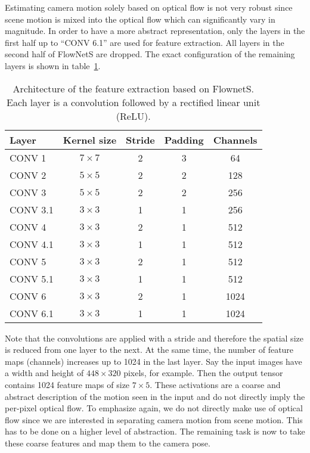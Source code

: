 			Estimating camera motion solely based on optical flow is not very robust since scene motion is mixed into the optical flow which can significantly vary in magnitude.
			In order to have a more abstract representation, only the layers in the first half up to ``CONV 6.1'' are used for feature extraction.
			All layers in the second half of FlowNetS are dropped.
			The exact configuration of the remaining layers is shown in table~\ref{tbl:first_part_of_flownets}.
			\begin{table}[tb]
				\small
				\begin{center}
					\begin{tabular}{lcccc}
						\toprule
						Layer 		& Kernel size 		& Stride 		& Padding 		& Channels 		\\
						\midrule
						CONV 1 		& $7 \times 7$		& 2 			& 3 			& 64 			\\
						CONV 2 		& $5 \times 5$		& 2 			& 2 			& 128 			\\
						CONV 3 		& $5 \times 5$		& 2 			& 2 			& 256			\\
						CONV 3.1 	& $3 \times 3$		& 1 			& 1 			& 256 			\\
						CONV 4 		& $3 \times 3$		& 2 			& 1 			& 512 			\\
						CONV 4.1 	& $3 \times 3$		& 1 			& 1 			& 512 			\\
						CONV 5 		& $3 \times 3$		& 2 			& 1 			& 512 			\\
						CONV 5.1 	& $3 \times 3$		& 1 			& 1 			& 512 			\\
						CONV 6 		& $3 \times 3$		& 2 			& 1 			& 1024 			\\
						CONV 6.1 	& $3 \times 3$		& 1 			& 1 			& 1024 			\\
						\bottomrule
					\end{tabular}
				\end{center}
				\caption[Architecture of the feature extraction based on FlownetS]
						{Architecture of the feature extraction based on FlownetS. 
						 Each layer is a convolution followed by a rectified linear unit (ReLU).
						 \label{tbl:first_part_of_flownets}}
			\end{table}
			Note that the convolutions are applied with a stride and therefore the spatial size is reduced from one layer to the next.
			At the same time, the number of feature maps (channels) increases up to 1024 in the last layer.
			Say the input images have a width and height of $448 \times 320$ pixels, for example. 
			Then the output tensor contains 1024 feature maps of size $7 \times 5$.
			These activations are a coarse and abstract description of the motion seen in the input and do not directly imply the per-pixel optical flow.
			To emphasize again, we do not directly make use of optical flow since we are interested in separating camera motion from scene motion.
			This has to be done on a higher level of abstraction.
			The remaining task is now to take these coarse features and map them to the camera pose. 
			
